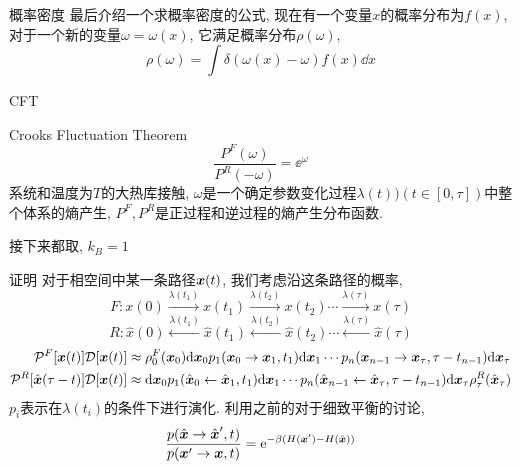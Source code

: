     \begin{frame}{概率密度}
        最后介绍一个求概率密度的公式, 现在有一个变量$x$的概率分布为$f(x)$, 对于一个新的变量$\omega = \omega(x)$, 它满足概率分布$\rho(\omega)$, 
        \begin{equation}
            \rho(\omega) = \int \delta(\omega(x) - \omega) f(x)\dd x
        \end{equation}
    \end{frame}
    \begin{frame}{CFT}
        \begin{alertblock}{Crooks Fluctuation Theorem}
            \begin{equation}
                \frac{P^F(\omega)}{P^R(-\omega)} = \ee^{\omega}
            \end{equation}
            系统和温度为$T$的大热库接触, $\omega$是一个确定参数变化过程$\lambda(t))(t\in[0,\tau])$中整个体系的熵产生, $P^F,P^R$是正过程和逆过程的熵产生分布函数.
        \end{alertblock}
        接下来都取, $k_B = 1$
    \end{frame}
    \begin{frame}{证明}
        对于相空间中某一条路径$\vb*x(t)$, 我们考虑沿这条路径的概率,
        $$
        F: x(0)\xrightarrow{\lambda(t_1)}x(t_1)\xrightarrow{\lambda(t_2)}x(t_2)\cdots \xrightarrow{\lambda(\tau)}x(\tau)
        $$
        $$
        R:  \hat x(0)\xleftarrow{\lambda(t_1)}\hat x(t_1)\xleftarrow{\lambda(t_2)}\hat x(t_2)\cdots \xleftarrow{\lambda(\tau)}\hat x(\tau)
        $$
        \begin{equation}
            \begin{split}
                \mathcal{P}^F[\vb*x(t)]\mathcal D[\vb*x(t)] &\approx\rho^F_0(\vb*x_0) \dd \vb*x_0p_1(\vb*x_0\to\vb*x_1,t_1)\dd\vb*x_1 \cdots p_n(\vb*x_{n-1}\to\vb*x_\tau,\tau-t_{n-1})\dd\vb*x_\tau\\
                \mathcal{P}^R[\hat{\vb*x}(\tau-t)]\mathcal D[\vb*x(t)] &\approx \dd\vb*x_0p_1(\hat{\vb*x}_0\leftarrow\hat{\vb*x}_1,t_1)\dd\vb*x_1 \cdots p_n(\hat{\vb*x}_{n-1}\leftarrow\hat{\vb*x}_\tau,\tau-t_{n-1})\dd\vb*x_\tau\rho^R_\tau(\hat{\vb*x}_\tau)
            \end{split}
        \end{equation}
        $p_i$表示在$\lambda(t_i)$的条件下进行演化. 利用之前的对于细致平衡的讨论,
        \[\dfrac{p(\hat{\vb*x}\to\hat{\vb*x}',t)}{p(\vb*x'\to\vb*x,t)} = \mathrm{e}^{-\beta(H(\vb*x') - H(\hat{\vb*x}))}
            \]
    \end{frame}
